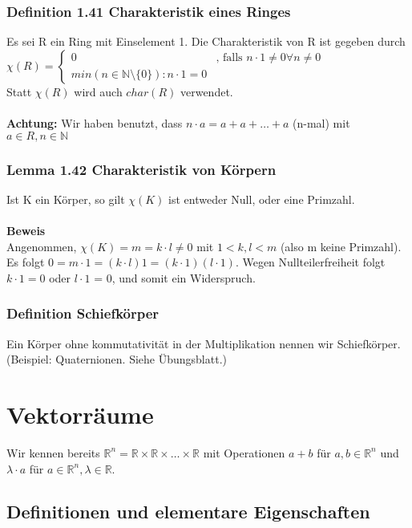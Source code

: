 \documentclass{scrartcl}
\newcommand{\lb}{\lambda}
\newcommand{\R}{\mathbb{R}}
\newcommand{\N}{\mathbb{N}}
\begin{document}
\subsubsection{Definition 1.41 Charakteristik eines Ringes}
Es sei R ein Ring mit Einselement 1. Die Charakteristik  von R ist gegeben durch\\
\(\chi(R) = \begin{cases}
0 & \text{, falls } n \cdot 1 \neq 0 \forall n \neq 0\\
min(n \in \N \setminus \{0\}) : n \cdot 1 = 0
\end{cases}\)\\
Statt \(\chi(R)\) wird auch \(char(R)\) verwendet.\\
\\
\textbf{Achtung:} Wir haben benutzt, dass \(n \cdot a = a + a + \dots + a\) (n-mal) mit \(a \in R, n \in \N\)

\subsubsection{Lemma 1.42 Charakteristik von K\"orpern}
Ist K ein K\"orper, so gilt \(\chi(K)\) ist entweder  Null, oder eine Primzahl.\\
\\
\textbf{Beweis}\\
Angenommen, \(\chi(K) = m = k \cdot l \neq 0\) mit  \(1 < k, l < m\) (also m keine Primzahl). Es folgt  \(0 = m \cdot 1 = (k \cdot l) 1 = (k \cdot 1)(l \cdot 1)\). Wegen Nullteilerfreiheit folgt \(k \cdot 1 = 0\) oder \(l \cdot 1\) = 0, und somit ein Widerspruch.

\subsubsection*{Definition Schiefk\"orper}
Ein K\"orper ohne kommutativit\"at in der Multiplikation nennen wir Schiefk\"orper. (Beispiel: Quaternionen. Siehe \"Ubungsblatt.)

\section{Vektorr\"aume}
Wir kennen bereits  \(\R^n = \R \times \R \times \dots \times \R\) mit Operationen \(a + b\) f\"ur \(a,b \in \R^n\) und \(\lb \cdot a\) f\"ur \(a \in \R^n, \lb \in \R\).

\subsection{Definitionen und elementare Eigenschaften}
\end{document}
